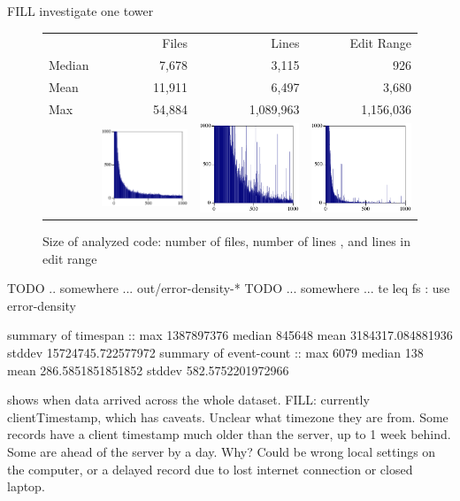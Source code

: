 \documentclass[english,submission,cleveref]{programming}
\begin{document}
FILL investigate one tower

\begin{figure}[t]
  \begin{tabular}{lrrr}
           & Files  &     Lines &    Edit Range \\
    Median &  7,678 &     3,115 &           926 \\
    Mean   & 11,911 &     6,497 &         3,680 \\
    Max    & 54,884 & 1,089,963 &     1,156,036 \\
    & \includegraphics[width=0.2\columnwidth]{img/files-distribution.pdf}
    & \includegraphics[width=0.2\columnwidth]{img/lines-distribution.pdf}
    & \includegraphics[width=0.2\columnwidth]{img/editrange-distribution.pdf}

  \end{tabular}

  \caption{Size of analyzed code: number of files, number of lines , and lines in edit range}
  \label{f:codebase-size}
\end{figure}

TODO .. somewhere ... out/error-density-*
TODO ... somewhere ... te leq fs : use error-density

summary of timespan :: max 1387897376 median 845648 mean 3184317.084881936 stddev 15724745.722577972
summary of event-count :: max 6079 median 138 mean 286.5851851851852 stddev 582.5752201972966

 shows when data arrived across the whole dataset.
FILL: currently clientTimestamp, which has caveats.
Unclear what timezone they are from.
Some records have a client timestamp much older than the server, up to 1 week behind.
Some are ahead of the server by a day.
Why?
Could be wrong local settings on the computer, or a delayed record due to lost
internet connection or closed laptop.
\end{document}
